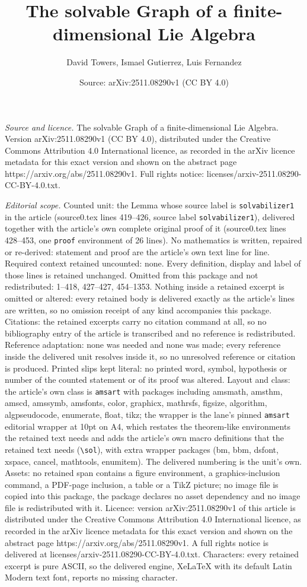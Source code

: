 \documentclass[10pt,a4paper]{amsart}
\title[The solvable Graph of a finite-dimensional Lie Algebra]{The solvable Graph of a finite-dimensional Lie Algebra}
\author{David Towers, Ismael Gutierrez, Luis Fernandez}
\date{Source: arXiv:2511.08290v1 (CC BY 4.0)}
\begin{document}
\maketitle

\noindent\emph{Source and licence.} The solvable Graph of a finite-dimensional Lie Algebra. Version arXiv:2511.08290v1 (CC BY 4.0), distributed under the Creative Commons Attribution 4.0 International licence, as recorded in the arXiv licence metadata for this exact version and shown on the abstract page https://arxiv.org/abs/2511.08290v1. Full rights notice: licenses/arxiv-2511.08290-CC-BY-4.0.txt.\par\smallskip

\noindent\textit{Editorial scope.} Counted unit: the Lemma whose source label is \texttt{solvabilizer1} in the article (source0.tex lines 419--426, source label \texttt{solvabilizer1}), delivered together with the article's own complete original proof of it (source0.tex lines 428--453, one \texttt{proof} environment of 26 lines). No mathematics is written, repaired or re-derived: statement and proof are the article's own text line for line. Required context retained uncounted: none. Every definition, display and label of those lines is retained unchanged. Omitted from this package and not redistributed: 1--418, 427--427, 454--1353. Nothing inside a retained excerpt is omitted or altered: every retained body is delivered exactly as the article's lines are written, so no omission receipt of any kind accompanies this package. Citations: the retained excerpts carry no citation command at all, so no bibliography entry of the article is transcribed and no reference is redistributed. Reference adaptation: none was needed and none was made; every reference inside the delivered unit resolves inside it, so no unresolved reference or citation is produced. Printed slips kept literal: no printed word, symbol, hypothesis or number of the counted statement or of its proof was altered. Layout and class: the article's own class is \texttt{amsart} with packages including amsmath, amsthm, amscd, amssymb, amsfonts, color, graphicx, mathrsfs, figsize, algorithm, algpseudocode, enumerate, float, tikz; the wrapper is the lane's pinned \texttt{amsart} editorial wrapper at 10pt on A4, which restates the theorem-like environments the retained text needs and adds the article's own macro definitions that the retained text needs (\texttt{\textbackslash sol}), with extra wrapper packages (bm, bbm, dsfont, xspace, cancel, mathtools, enumitem). The delivered numbering is the unit's own. Assets: no retained span contains a figure environment, a graphics-inclusion command, a PDF-page inclusion, a table or a TikZ picture; no image file is copied into this package, the package declares no asset dependency and no image file is redistributed with it. Licence: version arXiv:2511.08290v1 of this article is distributed under the Creative Commons Attribution 4.0 International licence, as recorded in the arXiv licence metadata for this exact version and shown on the abstract page https://arxiv.org/abs/2511.08290v1. A full rights notice is delivered at licenses/arxiv-2511.08290-CC-BY-4.0.txt. Characters: every retained excerpt is pure ASCII, so the delivered engine, XeLaTeX with its default Latin Modern text font, reports no missing character.
\end{document}
